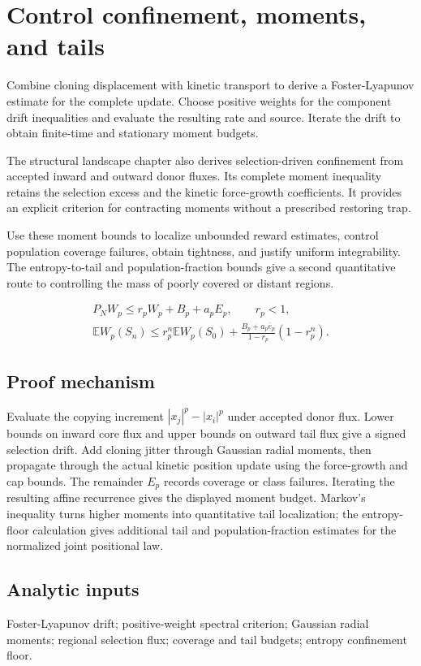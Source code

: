\documentclass[11pt,a4paper]{article}
\begin{document}
\section{Control confinement, moments, and tails}
\label{stage:3}
Combine cloning displacement with kinetic transport to derive a Foster-Lyapunov estimate for the complete update. Choose positive weights for the component drift inequalities and evaluate the resulting rate and source. Iterate the drift to obtain finite-time and stationary moment budgets.

The structural landscape chapter also derives selection-driven confinement from accepted inward and outward donor fluxes. Its complete moment inequality retains the selection excess and the kinetic force-growth coefficients. It provides an explicit criterion for contracting moments without a prescribed restoring trap.

Use these moment bounds to localize unbounded reward estimates, control population coverage failures, obtain tightness, and justify uniform integrability. The entropy-to-tail and population-fraction bounds give a second quantitative route to controlling the mass of poorly covered or distant regions.


\begin{gather*}
P_NW_p\le r_pW_p+B_p+a_pE_p,\qquad r_p<1,\\
\mathbb EW_p(S_n)\le r_p^n\mathbb EW_p(S_0)+\frac{B_p+a_p\overline e_p}{1-r_p}(1-r_p^n).
\end{gather*}
\subsection*{Proof mechanism}
Evaluate the copying increment \(|x_j|^p-|x_i|^p\) under accepted donor flux. Lower bounds on inward core flux and upper bounds on outward tail flux give a signed selection drift. Add cloning jitter through Gaussian radial moments, then propagate through the actual kinetic position update using the force-growth and cap bounds. The remainder \(E_p\) records coverage or class failures. Iterating the resulting affine recurrence gives the displayed moment budget. Markov's inequality turns higher moments into quantitative tail localization; the entropy-floor calculation gives additional tail and population-fraction estimates for the normalized joint positional law.
\subsection*{Analytic inputs}
Foster-Lyapunov drift; positive-weight spectral criterion; Gaussian radial moments; regional selection flux; coverage and tail budgets; entropy confinement floor.
\end{document}
